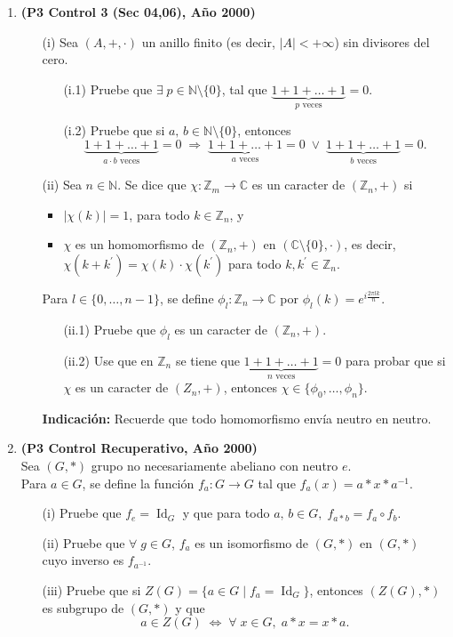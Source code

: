 \documentclass[11pt]{article}
\newcommand{\N}{\mathbb N}
\newcommand{\Z}{\mathbb Z}
\newcommand{\C}{\mathbb C}
\newcommand{\NN}{\N\setminus\{0\}}
\theoremstyle{plain}
\theoremstyle{definition}
\newcommand{\id}{\operatorname{Id}} %
\begin{document}
\begin{enumerate}
\item \textbf{(P3 Control 3 (Sec 04,06), Año 2000)}
\begin{enumerate}
\item[(i)] Sea $(A,+,\cdot)$ un anillo finito (es decir, $|A|<+\infty$) sin divisores del cero.
\begin{enumerate}
\item[(i.1)] Pruebe que $\exists\;p\in\NN$, tal que $\underbrace{1+1+\ldots+1}_{\mbox{$p$ veces}}=0$.
\item[(i.2)] Pruebe que si $a,\,b\in\NN$, entonces
$$\underbrace{1+1+\ldots+1}_{\mbox{$a\cdot b$ veces}}=0 \; \Longrightarrow \; \underbrace{1+1+\ldots+1}_{\mbox{$a$ veces}}=0 \; \vee \; \underbrace{1+1+\ldots+1}_{\mbox{$b$ veces}}=0.$$
\end{enumerate}
\item[(ii)] Sea $n\in\N$. Se dice que $\chi: \Z_m\longrightarrow \C$ es un caracter de $(\Z_n,+)$ si
\begin{itemize}
\item $|\chi(k)|=1$, para todo $k\in\Z_n$, y 
\item $\chi$ es un homomorfismo de $(\Z_n,+)$ en $(\C\setminus\{0\},\cdot)$, es decir, $\chi(k+k^{\prime})=\chi(k)\cdot\chi(k^{\prime})$ para todo $k,k^{\prime}\in\Z_n$.
\end{itemize}
Para $l\in\{0,\ldots,n-1\}$, se define $\phi_l: \Z_n\longrightarrow \C$ por $\phi_l(k)=e^{i\frac{2\pi l k}{n}}$.
\begin{enumerate}
\item[(ii.1)] Pruebe que $\phi_l$ es un caracter de $(\Z_n,+)$.
\item[(ii.2)] Use que en $\Z_n$ se tiene que $\underbrace{1+1+\ldots+1}_{\mbox{$n$ veces}}=0$ para probar que si $\chi$ es un caracter de $(Z_n,+)$, entonces $\chi\in\{\phi_0,\ldots,\phi_n\}$.
\end{enumerate}
\textbf{Indicación:} Recuerde que todo homomorfismo envía neutro en neutro.
\end{enumerate}

\item \textbf{(P3 Control Recuperativo, Año 2000)}\\
Sea $(G,*)$ grupo no necesariamente abeliano con neutro $e$.\\
Para $a\in G$, se define la función $f_a: G\longrightarrow G$ tal que $f_a(x)=a*x*a^{-1}$.
\begin{enumerate}
\item[(i)] Pruebe que $f_e=\id_G$ y que para todo $a,\,b \in G,\; f_{a*b}=f_a\circ f_b$.
\item[(ii)] Pruebe que $\forall\; g\in G$, $f_a$ es un isomorfismo de $(G,*)$ en $(G,*)$ cuyo inverso es $f_{a^{-1}}$.
\item[(iii)] Pruebe que si $Z(G)=\{a\in G\;|\;f_a=\id_G\}$, entonces $(Z(G),*)$ es subgrupo de $(G,*)$ y que
$$a\in Z(G) \; \Longleftrightarrow \; \forall\;x\in G,\; a*x=x*a.$$
\end{enumerate}


\end{enumerate}
\end{document}

